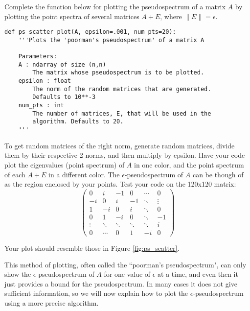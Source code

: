 \begin{problem}
Complete the function below for plotting the pseudospectrum of a matrix $A$ by plotting the point spectra of several matrices $A+E$, where $\lVert E \rVert = \epsilon$. 

\begin{lstlisting}
def ps_scatter_plot(A, epsilon=.001, num_pts=20):
    '''Plots the 'poorman's pseudospectrum' of a matrix A
    
    Parameters:
    A : ndarray of size (n,n)
        The matrix whose pseudospectrum is to be plotted.
    epsilon : float
        The norm of the random matrices that are generated.
        Defaults to 10**-3
    num_pts : int
        The number of matrices, E, that will be used in the
        algorithm. Defaults to 20.       
    '''
\end{lstlisting}

To get random matrices of the right norm, generate random matrices, divide them by their respective 2-norms, and then multiply by epsilon.
Have your code plot the eigenvalues (point spectrum) of $A$ in one color, and the point spectrum of each $A+E$ in a different color.  The $\epsilon$-pseudospectrum of $A$ can be though of as the region enclosed by your points.  Test your code on the 120x120 matrix:
\begin{equation}
	\begin{pmatrix}
		0  &  i  &  -1  &  0  & \cdots  &  0  \\
		-i &  0  &   i  & -1 & \ddots  &  \vdots  \\
		1  & -i  &   0  &  i &\ddots&  0  \\
		0   & 1 & -i & 0 &\ddots& -1\\
		\vdots   & \ddots    & \ddots & \ddots &\ddots & i\\
		 0  &  \cdots     &   0     &    1  &   -i  & 0
		\end{pmatrix}
\label{prob:pseudoplot}
\end{equation}

Your plot should resemble those in Figure \ref{fig:ps_scatter}.
\end{problem}

This method of plotting, often called the ``poorman's pseudospectrum", can only show the $\epsilon$-pseudospectrum of $A$ for one value of $\epsilon$ at a time, and even then it just provides a bound for the pseudospectrum. In many cases it does not give sufficient information, so we will now explain how to plot the $\epsilon$-pseudospectrum using a more precise algorithm.

